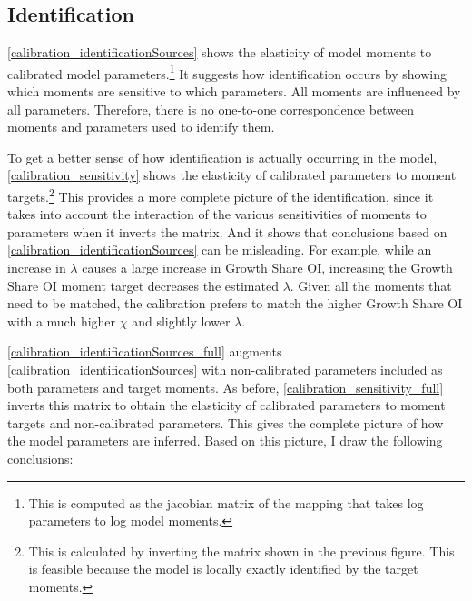 \documentclass[11pt,english]{article}
\begin{document}
\normalsize

\subsection{Identification}

\autoref{calibration_identificationSources} shows the elasticity of model moments to calibrated model parameters.\footnote{This is computed as the jacobian matrix of the mapping that takes log parameters to log model moments.} It suggests how identification occurs by showing which moments are sensitive to which parameters. All moments are influenced by all parameters. Therefore, there is no one-to-one correspondence between moments and parameters used to identify them. 

To get a better sense of how identification is actually occurring in the model, \autoref{calibration_sensitivity} shows the elasticity of calibrated parameters to moment targets.\footnote{This is calculated by inverting the matrix shown in the previous figure. This is feasible because the model is locally exactly identified by the target moments.} This provides a more complete picture of the identification, since it takes into account the interaction of the various sensitivities of moments to parameters when it inverts the matrix. And it shows that conclusions based on \autoref{calibration_identificationSources} can be misleading. For example, while an increase in $\lambda$ causes a large increase in Growth Share OI, increasing the Growth Share OI moment target decreases the estimated $\lambda$. Given all the moments that need to be matched, the calibration prefers to match the higher Growth Share OI with a much higher $\chi$ and slightly lower $\lambda$.

\autoref{calibration_identificationSources_full} augments \autoref{calibration_identificationSources} with non-calibrated parameters included as both parameters and target moments. As before, \autoref{calibration_sensitivity_full} inverts this matrix to obtain the elasticity of calibrated parameters to moment targets and non-calibrated parameters. This gives the complete picture of how the model parameters are inferred. Based on this picture, I draw the following conclusions:
\end{document}
